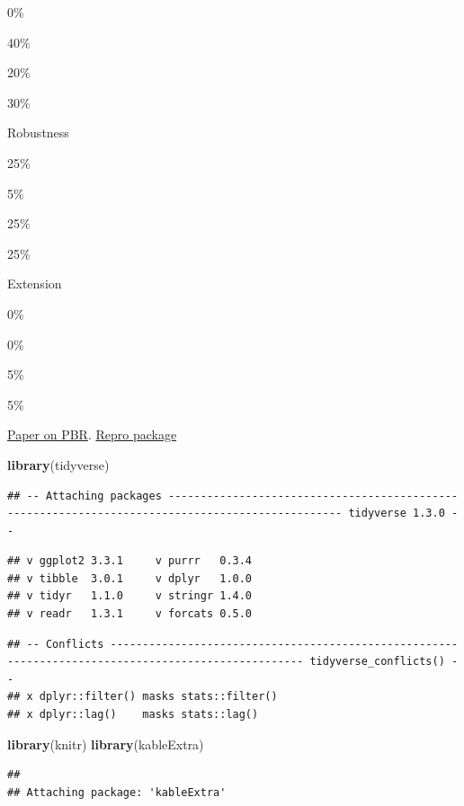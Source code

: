 \documentclass[]{book}
\newenvironment{Shaded}{\begin{snugshade}}{\end{snugshade}}
\newcommand{\KeywordTok}[1]{\textcolor[rgb]{0.13,0.29,0.53}{\textbf{#1}}}
\newcommand{\NormalTok}[1]{#1}
\begin{document}
0\%

40\%

20\%

30\%

Robustness

25\%

5\%

25\%

25\%

Extension

0\%

0\%

5\%

5\%

\href{https://osf.io/4jvq2/download}{Paper on PBR}. \href{https://dataverse.harvard.edu/dataset.xhtml?persistentId=doi:10.7910/DVN/FPNITS}{Repro package}

\begin{Shaded}
\begin{Highlighting}[]
\KeywordTok{library}\NormalTok{(tidyverse)}
\end{Highlighting}
\end{Shaded}

\begin{verbatim}
## -- Attaching packages ------------------------------------------------------------------------------------------------- tidyverse 1.3.0 --
\end{verbatim}

\begin{verbatim}
## v ggplot2 3.3.1     v purrr   0.3.4
## v tibble  3.0.1     v dplyr   1.0.0
## v tidyr   1.1.0     v stringr 1.4.0
## v readr   1.3.1     v forcats 0.5.0
\end{verbatim}

\begin{verbatim}
## -- Conflicts ---------------------------------------------------------------------------------------------------- tidyverse_conflicts() --
## x dplyr::filter() masks stats::filter()
## x dplyr::lag()    masks stats::lag()
\end{verbatim}

\begin{Shaded}
\begin{Highlighting}[]
\KeywordTok{library}\NormalTok{(knitr)}
\KeywordTok{library}\NormalTok{(kableExtra)}
\end{Highlighting}
\end{Shaded}

\begin{verbatim}
## 
## Attaching package: 'kableExtra'
\end{verbatim}
\end{document}
